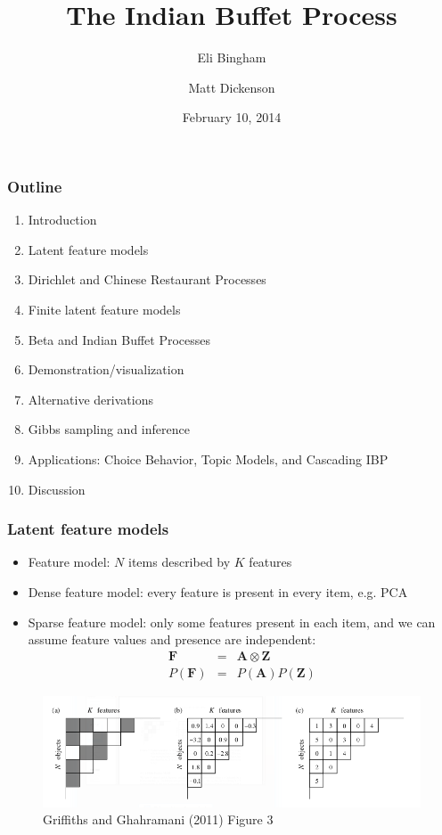\documentclass[13pt]{beamer}
\title[Indian Buffet Process]{The Indian Buffet Process}
\author[Bingham and Dickenson]{Eli Bingham\inst{1} \and Matt Dickenson\inst{2}}
\institute[UNC and Duke]{\inst{1} University of North Carolina \and \inst{2} Duke University}
\date{February 10, 2014}
\begin{document}
\begin{frame}
\titlepage
\end{frame}
\begin{frame}
\frametitle{Outline}
\begin{enumerate}
\item Introduction
\item Latent feature models
\item Dirichlet and Chinese Restaurant Processes
\item Finite latent feature models
\item Beta and Indian Buffet Processes
\item Demonstration/visualization
\item Alternative derivations
\item Gibbs sampling and inference
\item Applications: Choice Behavior, Topic Models, and Cascading IBP
\item Discussion
\end{enumerate}
\end{frame}
\begin{frame}
\frametitle{Latent feature models}
\begin{itemize}
\item Feature model: $N$ items described by $K$ features
\item Dense feature model: every feature is present in every item, e.g. PCA
\item Sparse feature model: only some features present in each item, and we can assume feature values and presence are independent:
    \begin{eqnarray*}
        \mathbf{F} &=& \mathbf{A} \otimes \mathbf{Z} \\
        P(\mathbf{F}) &=& P(\mathbf{A})P(\mathbf{Z})
    \end{eqnarray*}
\end{itemize}

\begin{figure}
\begin{center}
\includegraphics[scale=0.4]{./img/featuremodel.png}
\caption{Griffiths and Ghahramani (2011) Figure 3}
\end{center}
\end{figure}
\end{frame}
\end{document}
